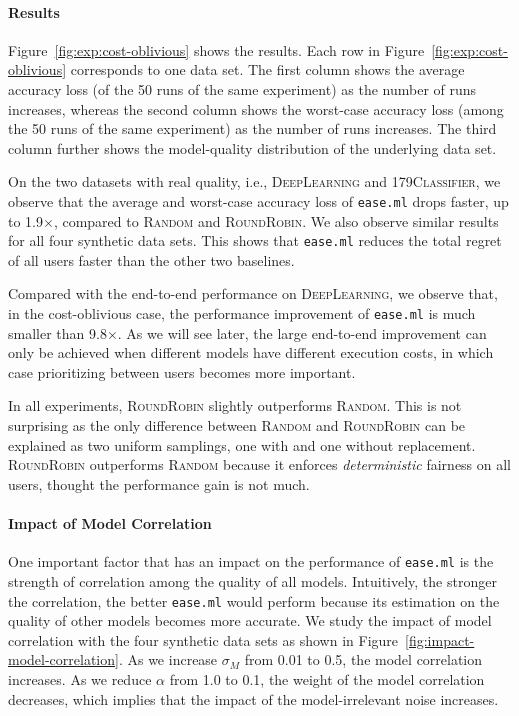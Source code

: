 \documentclass[letterpaper]{vldb}
\newcommand{\eml}{\texttt{ease.ml}\xspace}
\begin{document}
\paragraph*{Results}
Figure~\ref{fig:exp:cost-oblivious} shows the 
results. Each row in Figure~\ref{fig:exp:cost-oblivious} corresponds
to one data set.
The first column shows the average accuracy loss (of the 50 runs of the same experiment) as the number of runs increases, whereas the second column shows the worst-case accuracy loss (among the 50 runs of the same experiment) as the number of runs increases.
The third column further shows the model-quality distribution of the underlying data set.

On the two datasets with real
quality, i.e., \textsc{DeepLearning} and 
\textsc{179Classifier}, we observe that the 
average and worst-case accuracy loss of \eml 
drops faster, up to 1.9$\times$,
compared to \textsc{Random} and 
\textsc{RoundRobin}. We also observe
similar results for all four synthetic data sets.
This shows that \eml reduces the total regret 
of all users faster than the other two baselines.

Compared with the end-to-end performance on 
\textsc{DeepLearning},
we observe that, in the cost-oblivious case, the performance
improvement of \eml is much smaller than
9.8$\times$. As we will see later, the 
large end-to-end improvement can only be
achieved when different models have different
execution costs, in which case %
prioritizing between users becomes more important.

In all experiments, \textsc{RoundRobin} 
slightly outperforms \textsc{Random}. This is not 
surprising as the only difference
between \textsc{Random} and \textsc{RoundRobin} can be explained as two
uniform samplings, one with and one without replacement.
\textsc{RoundRobin} %
outperforms \textsc{Random}
because it enforces {\em deterministic} 
fairness on all users, thought the performance gain is not much.

\paragraph*{Impact of Model Correlation}

One important factor that has an impact on
the performance of \eml is the strength
of correlation among the quality of all models.
Intuitively, the stronger the correlation,
the better \eml would perform because its
estimation on the quality of other models
becomes more accurate. We study the
impact of model correlation with the
four synthetic data sets
as shown in Figure~\ref{fig:impact-model-correlation}.
As we increase $\sigma_M$ from 0.01 to 0.5, the 
model correlation increases. As we reduce $\alpha$ from 1.0 to 0.1, the weight of the model correlation decreases, which implies that the impact of the model-irrelevant noise increases.
\end{document}

